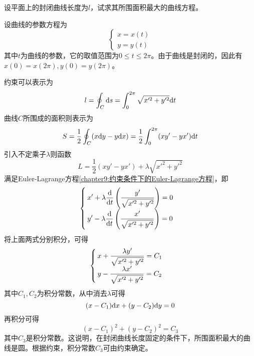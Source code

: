 \begin{example}
设平面上的封闭曲线长度为$l$，试求其所围面积最大的曲线方程。
\end{example}
\begin{solution}
设曲线的参数方程为
\begin{equation*}
\begin{cases}
	x = x(t) \\
	y = y(t)
\end{cases}
\end{equation*}
其中$t$为曲线的参数，它的取值范围为$0\leqslant t\leqslant 2\pi$。由于曲线是封闭的，因此有$x(0)=x(2\pi),y(0)=y(2\pi)$。

约束可以表示为
\begin{equation*}
	l = \oint_C \mathrm{d} s = \int_0^{2\pi}\sqrt{x'^2+y'^2}\mathrm{d} t
\end{equation*}
曲线$C$所围成的面积则表示为
\begin{equation*}
	S = \frac12 \oint_C(x\mathrm{d} y-y\mathrm{d} x) = \frac12\int_0^{2\pi}(xy'-yx')\mathrm{d} t
\end{equation*}
引入不定乘子$\lambda$则函数
\begin{equation*}
	L = \frac12(xy'-yx')+\lambda\sqrt{x'^2+y'^2}
\end{equation*}
满足Euler-Lagrange方程\eqref{chapter9:约束条件下的Euler-Lagrange方程}，即
\begin{equation*}
\begin{cases}
	\displaystyle x'+\lambda\dfrac{\mathrm{d}}{\mathrm{d} t}\left(\frac{y'}{\sqrt{x'^2+y'^2}}\right) = 0 \\[1.5ex]
	\displaystyle y'-\lambda\dfrac{\mathrm{d}}{\mathrm{d} t}\left(\frac{x'}{\sqrt{x'^2+y'^2}}\right) = 0
\end{cases}
\end{equation*}
将上面两式分别积分，可得
\begin{equation*}
\begin{cases}
	\displaystyle x+\frac{\lambda y'}{\sqrt{x'^2+y'^2}} = C_1 \\[1.5ex]
	\displaystyle y-\frac{\lambda x'}{\sqrt{x'^2+y'^2}} = C_2
\end{cases}
\end{equation*}
其中$C_1,C_2$为积分常数，从中消去$\lambda$可得
\begin{equation*}
	(x-C_1)\mathrm{d} x+(y-C_2)\mathrm{d} y=0
\end{equation*}
再积分可得
\begin{equation*}
	(x-C_1)^2+(y-C_2)^2=C_3
\end{equation*}
其中$C_3$是积分常数。这说明，在封闭曲线长度固定的条件下，所围面积最大的曲线是圆。根据约束，积分常数$C_3$可由约束确定。
\end{solution}

